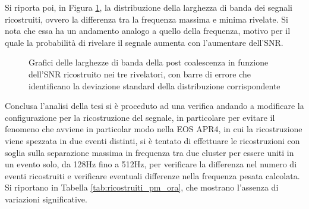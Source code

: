 Si riporta poi, in Figura \ref{fig:bandwidth_pm_Distrib}, la distribuzione della larghezza di banda dei segnali ricostruiti, ovvero la differenza tra la frequenza massima e minima rivelate. Si nota che essa ha un andamento analogo a quello della frequenza, motivo per il quale la probabilità di rivelare il segnale aumenta con l'aumentare dell'SNR.
\begin{figure}[hbt!]
	\centering
	\caption{Grafici delle larghezze di banda della post coalescenza in funzione dell'SNR ricostruito nei tre rivelatori, con barre di errore che identificano la deviazione standard della distribuzione corrispondente}
	\label{fig:bandwidth_pm_Distrib}
\end{figure}

Conclusa l'analisi della tesi si è proceduto ad una verifica andando a modificare la configurazione per la ricostruzione del segnale, in particolare per evitare il fenomeno che avviene in particolar modo nella EOS APR4, in cui la ricostruzione viene spezzata in due eventi distinti, si è tentato di effettuare le ricostruzioni con soglia sulla separazione massima in frequenza tra due cluster per essere uniti in un evento solo, da 128Hz fino a 512Hz, per verificare la differenza nel numero di eventi ricostruiti e verificare eventuali differenze nella frequenza pesata calcolata. Si riportano in Tabella \ref{tab:ricostruiti_pm_ora}, che mostrano l'assenza di variazioni significative.


